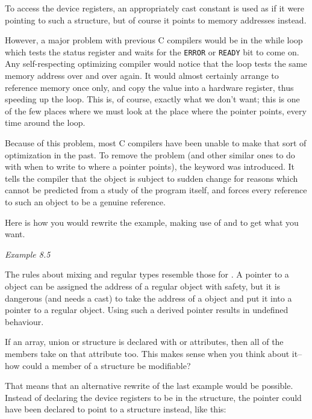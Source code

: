    To access the device registers, an appropriately cast constant is used
    as if it were pointing to such a structure, but of course it points to
    memory addresses instead.


   However, a major problem with previous C compilers would be in the
    while loop which tests the status register and waits for the
    \texttt{ERROR} or \texttt{READY} bit to come on. Any
    self-respecting optimizing compiler would notice that the loop tests the
    same memory address over and over again. It would almost certainly
    arrange to reference memory once only, and copy the value into
    a hardware register, thus speeding up the loop. This is, of course,
    exactly what we don't want; this is one of the few places where we must
    look at the place where the pointer points, every time around the
    loop.


   Because of this problem, most C compilers have been unable to make
    that sort of optimization in the past. To remove the problem (and other
    similar ones to do with when to write to where a pointer points), the
    keyword \volatile{} was introduced. It tells the compiler that
    the object is subject to sudden change for reasons which cannot be
    predicted from a study of the program itself, and forces every reference
    to such an object to be a genuine reference.


   Here is how you would rewrite the example, making use of
    \const{} and \volatile{} to get what you want.


    \begin{center}\textit{Example 8.5}\end{center}


   The rules about mixing \volatile{} and regular types
    resemble those for \const. A pointer to
    a \volatile{} object can be assigned the address of a regular
    object with safety, but it is dangerous (and needs a cast) to take the
    address of a \volatile{} object and put it into a pointer to
    a regular object. Using such a derived pointer results in undefined
    behaviour.


   If an array, union or structure is declared with \const{} or
    \volatile{} attributes, then all of the members take on that
    attribute too. This makes sense when you think about it--how could
    a member of a \const{} structure be modifiable?


   That means that an alternative rewrite of the last example would be
    possible. Instead of declaring the device registers to be
    \volatile{} in the structure, the pointer could have been
    declared to point to a \volatile{} structure instead, like
    this:


